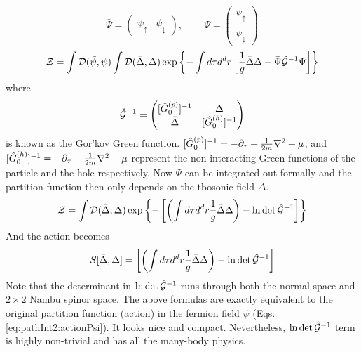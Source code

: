 \begin{equation}
\bar\Psi=\begin{pmatrix}\bar{\psi}_{\uparrow}&\psi_{\downarrow}\end{pmatrix}\text{,  }\qquad
\Psi=\begin{pmatrix}{\psi}_{\uparrow}\\\bar\psi_{\downarrow}\end{pmatrix}
\end{equation}
\begin{equation}
\mathcal{Z}=\int{\ensuremath{\mathcal{D}}(\bar\psi,\psi)}\int{\ensuremath{\mathcal{D}}(\bar\Delta,\Delta)}\exp
	\left\{-\int{d\tau{d^{d}r}}\left[\frac{1}{g}{\bar\Delta}{\Delta}-\bar\Psi \hat{\mathcal{G}}^{-1}\Psi\right]\right\}
\end{equation}
where 
\begin{equation}\label{eq:pathInt:nG}
\hat{\mathcal{G}}^{-1}=\begin{pmatrix}
[\hat{G}_{0}^{(p)}]^{-1}&\Delta\\\bar\Delta&[\hat{G}_{0}^{(h)}]^{-1}
\end{pmatrix}
\end{equation}
is known as the Gor'kov Green function. $[\hat{G}_{0}^{(p)}]^{-1}=-\partial_{\tau}+\frac{1}{2m}\nabla^{2}+\mu$, and $[\hat{G}_{0}^{(h)}]^{-1}=-\partial_{\tau}-\frac{1}{2m}\nabla^{2}-\mu$ represent the non-interacting Green functions of the particle and the hole respectively. Now $\Psi$ can be integrated out formally and the partition function then only depends on the tbosonic field $\Delta$.  
\begin{equation}\label{eq:pathInt:DeltaPF}
\mathcal{Z}=\int{\ensuremath{\mathcal{D}}(\bar\Delta,\Delta)}\exp
	\left\{-\left[\left(\int{d\tau{d^{d}r}}\frac{1}{g}{\bar\Delta\Delta}\right)-\ln\det\hat{\mathcal{G}}^{-1}\right]\right\}
\end{equation}
And the action becomes
\begin{equation}\label{eq:pathInt:DeltaAction}
S[\bar\Delta,\Delta]=
	{\left[\left(\int{d\tau{d^{d}r}}\frac{1}{g}{\bar\Delta\Delta}\right)-\ln\det\hat{\mathcal{G}}^{-1}\right]}
\end{equation}
Note that the determinant in $\ln\det\hat{\mathcal{G}}^{-1}$ runs through both the normal space and $2\times2$ Nambu spinor space.  The above formulas are exactly equivalent to the original partition function (action) in the fermion field $\psi$ (Eqs. \ref{eq:pathInt2:actionPsi}). It looks nice and compact. Nevertheless, $\ln\det\hat{\mathcal{G}}^{-1}$ term is highly non-trivial and has all the many-body physics.

